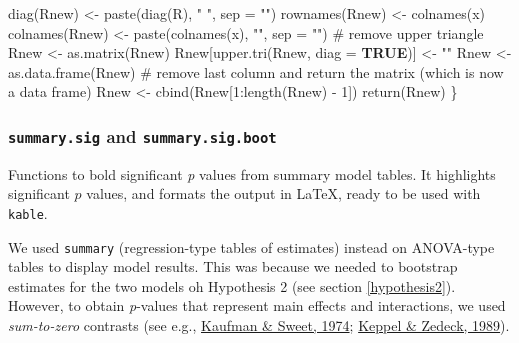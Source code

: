 \documentclass[
  bookmarksnumbered]{article}
\newenvironment{Shaded}{\begin{snugshade}}{\end{snugshade}}
\newcommand{\AttributeTok}[1]{\textcolor[rgb]{0.80,0.80,0.80}{#1}}
\newcommand{\CommentTok}[1]{\textcolor[rgb]{0.50,0.62,0.50}{#1}}
\newcommand{\ConstantTok}[1]{\textcolor[rgb]{0.86,0.64,0.64}{\textbf{#1}}}
\newcommand{\DecValTok}[1]{\textcolor[rgb]{0.86,0.86,0.80}{#1}}
\newcommand{\FunctionTok}[1]{\textcolor[rgb]{0.94,0.94,0.56}{#1}}
\newcommand{\NormalTok}[1]{\textcolor[rgb]{0.80,0.80,0.80}{#1}}
\newcommand{\OtherTok}[1]{\textcolor[rgb]{0.94,0.94,0.56}{#1}}
\newcommand{\SpecialCharTok}[1]{\textcolor[rgb]{0.86,0.64,0.64}{#1}}
\newcommand{\StringTok}[1]{\textcolor[rgb]{0.80,0.58,0.58}{#1}}
\begin{document}
\begin{Shaded}
\begin{Highlighting}[]
  \FunctionTok{diag}\NormalTok{(Rnew) }\OtherTok{\textless{}{-}} \FunctionTok{paste}\NormalTok{(}\FunctionTok{diag}\NormalTok{(R), }\StringTok{" "}\NormalTok{, }
                      \AttributeTok{sep =} \StringTok{""}\NormalTok{)}
  \FunctionTok{rownames}\NormalTok{(Rnew) }\OtherTok{\textless{}{-}} \FunctionTok{colnames}\NormalTok{(x)}
  \FunctionTok{colnames}\NormalTok{(Rnew) }\OtherTok{\textless{}{-}} \FunctionTok{paste}\NormalTok{(}\FunctionTok{colnames}\NormalTok{(x), }\StringTok{""}\NormalTok{, }
                          \AttributeTok{sep =} \StringTok{""}\NormalTok{)}
  \CommentTok{\# remove upper triangle}
\NormalTok{  Rnew }\OtherTok{\textless{}{-}} \FunctionTok{as.matrix}\NormalTok{(Rnew)}
\NormalTok{  Rnew[}\FunctionTok{upper.tri}\NormalTok{(Rnew, }\AttributeTok{diag =} \ConstantTok{TRUE}\NormalTok{)] }\OtherTok{\textless{}{-}} \StringTok{""}
\NormalTok{  Rnew }\OtherTok{\textless{}{-}} \FunctionTok{as.data.frame}\NormalTok{(Rnew)}
  \CommentTok{\# remove last column and return the matrix (which is now a data frame)}
\NormalTok{  Rnew }\OtherTok{\textless{}{-}} \FunctionTok{cbind}\NormalTok{(Rnew[}\DecValTok{1}\SpecialCharTok{:}\FunctionTok{length}\NormalTok{(Rnew) }\SpecialCharTok{{-}} \DecValTok{1}\NormalTok{])}
  \FunctionTok{return}\NormalTok{(Rnew)}
\NormalTok{\}}
\end{Highlighting}
\end{Shaded}

\hypertarget{summary.sig-and-summary.sig.boot}{%
\subsubsection{\texorpdfstring{\texttt{summary.sig} and \texttt{summary.sig.boot}}{summary.sig and summary.sig.boot}}\label{summary.sig-and-summary.sig.boot}}

Functions to bold significant \emph{p} values from summary model tables. It highlights significant \(p\) values, and formats the output in \LaTeX, ready to be used with \texttt{kable}.

We used \texttt{summary} (regression-type tables of estimates) instead on ANOVA-type tables to display model results. This was because we needed to bootstrap estimates for the two models oh Hypothesis 2 (see section \ref{hypothesis2}). However, to obtain \emph{p}-values that represent main effects and interactions, we used \emph{sum-to-zero} contrasts (see e.g., \protect\hyperlink{ref-kaufmanContrastCodingLeast1974}{Kaufman \& Sweet, 1974}; \protect\hyperlink{ref-keppelDataAnalysisResearch1989}{Keppel \& Zedeck, 1989}).
\end{document}
